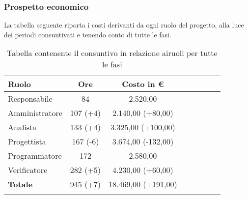 \subsubsection{Prospetto economico}

La tabella seguente riporta i costi derivanti da ogni ruolo del progetto, alla luce dei periodi consuntivati e tenendo conto di tutte le fasi.

\begin{longtable}{|l|c|c|c|c|c|c|c|}
	\hline
	\rowcolor{lighter-grayer}
	\textbf{Ruolo}  & \textbf{Ore} & \textbf{Costo in €} \\
	\hline
	\endfirsthead

	\hline
	Responsabile    & 84           & 2.520,00            \\
	\hline
	\hline
	Amministratore  & 107 (+4)          & 2.140,00 (+80,00)           \\
	\hline
	\hline
	Analista        & 133 (+4)         & 3.325,00 (+100,00)           \\
	\hline
	\hline
	Progettista     & 167 (-6)         & 3.674,00 (-132,00)           \\
	\hline
	\hline
	Programmatore   & 172          & 2.580,00            \\
	\hline
	\hline
	Verificatore    & 282 (+5)         & 4.230,00 (+60,00)           \\
	\hline
	\hline
	\textbf{Totale} & 945 (+7)         & 18.469,00 (+191,00)          \\
	\hline
	\rowcolor{white}
	\caption{Tabella contenente il consuntivo in relazione airuoli per tutte le fasi}
\end{longtable}



